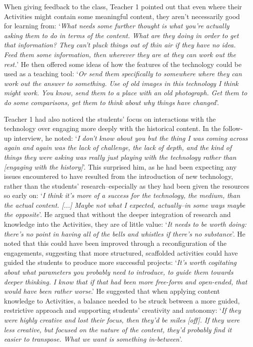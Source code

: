 \documentclass[,hyphens]{sigchi}
\begin{document}
When giving feedback to the class, Teacher 1 pointed out that even where their Activities might contain some meaningful content, they aren't necessarily good for learning from: `\textit{What needs some further thought is what you're actually asking them to do in terms of the content. What are they doing in order to get that information? They can't pluck things out of thin air if they have no idea. Feed them some information, then wherever they are at they can work out the rest.}' He then offered some ideas of how the features of the technology could be used as a teaching tool: `\textit{Or send them specifically to somewhere where they can work out the answer to something. Use of old images in this technology I think might work. You know, send them to a place with an old photograph. Get them to do some comparisons, get them to think about why things have changed}'.

Teacher 1 had also noticed the students' focus on interactions with the technology over engaging more deeply with the historical content. In the follow-up interview, he noted: `\textit{I don't know about you but the thing I was coming across again and again was the lack of challenge, the lack of depth, and the kind of things they were asking was really just playing with the technology rather than [engaging with the history]}'. This surprised him, as he had been expecting any issues encountered to have resulted from the introduction of new technology, rather than the students' research--especially as they had been given the resources so early on: `\textit{I think it's more of a success for the technology, the medium, than the actual content. [...] Maybe not what I expected, actually--in some ways maybe the opposite}'. He argued that without the deeper integration of research and knowledge into the Activities, they are of little value: `\textit{It needs to be worth doing: there's no point in having all of the bells and whistles if there's no substance}'. He noted that this could have been improved through a reconfiguration of the engagements, suggesting that more structured, scaffolded activities could have guided the students to produce more successful projects: `\textit{It's worth cogitating about what parameters you probably need to introduce, to guide them towards deeper thinking. I know that if that had been more free-form and open-ended, that would have been rather worse}.' He suggested that when applying content knowledge to Activities, a balance needed to be struck between a more guided, restrictive approach and supporting students' creativity and autonomy: `\textit{If they were highly creative and lost their focus, then they'd be miles [off]. If they were less creative, but focused on the nature of the content, they'd probably find it easier to transpose. What we want is something in-between}'.
\end{document}
